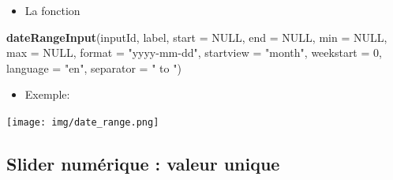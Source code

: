 \documentclass[
]{article}
\newenvironment{Shaded}{\begin{snugshade}}{\end{snugshade}}
\newcommand{\AttributeTok}[1]{\textcolor[rgb]{0.13,0.29,0.53}{#1}}
\newcommand{\CommentTok}[1]{\textcolor[rgb]{0.56,0.35,0.01}{\textit{#1}}}
\newcommand{\ConstantTok}[1]{\textcolor[rgb]{0.56,0.35,0.01}{#1}}
\newcommand{\DecValTok}[1]{\textcolor[rgb]{0.00,0.00,0.81}{#1}}
\newcommand{\FunctionTok}[1]{\textcolor[rgb]{0.13,0.29,0.53}{\textbf{#1}}}
\newcommand{\NormalTok}[1]{#1}
\newcommand{\StringTok}[1]{\textcolor[rgb]{0.31,0.60,0.02}{#1}}
\providecommand{\tightlist}{%
  \setlength{\itemsep}{0pt}\setlength{\parskip}{0pt}}
\begin{document}
\begin{itemize}
\tightlist
\item
  La fonction
\end{itemize}

\begin{Shaded}
\begin{Highlighting}[]
\FunctionTok{dateRangeInput}\NormalTok{(inputId, label, }\AttributeTok{start =} \ConstantTok{NULL}\NormalTok{, }\AttributeTok{end =} \ConstantTok{NULL}\NormalTok{, }\AttributeTok{min =} \ConstantTok{NULL}\NormalTok{, }\AttributeTok{max =} \ConstantTok{NULL}\NormalTok{,}
               \AttributeTok{format =} \StringTok{"yyyy{-}mm{-}dd"}\NormalTok{, }\AttributeTok{startview =} \StringTok{"month"}\NormalTok{, }\AttributeTok{weekstart =} \DecValTok{0}\NormalTok{,}
               \AttributeTok{language =} \StringTok{"en"}\NormalTok{, }\AttributeTok{separator =} \StringTok{" to "}\NormalTok{)}
\end{Highlighting}
\end{Shaded}

\begin{itemize}
\tightlist
\item
  Exemple:
\end{itemize}

\begin{Shaded}
\end{Shaded}

\texttt{[image: img/date\_range.png]}

\hypertarget{slider-numuxe9rique-valeur-unique}{%
\subsection{Slider numérique : valeur
unique}\label{slider-numuxe9rique-valeur-unique}}
\end{document}
